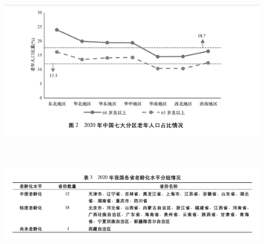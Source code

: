 \documentclass[presentation]{beamer}
\begin{document}
\begin{frame}[label={sec:org18d29be}]{​}
\begin{figure}[htbp]
\centering
\includegraphics[width=.99\textwidth]{./8.png}
\label{}
\end{figure}
\end{frame}
\begin{frame}[label={sec:orgc0e4e1e}]{​}
\begin{figure}[htbp]
\centering
\includegraphics[width=.99\textwidth]{./9.png}
\label{}
\end{figure}
\end{frame}
\end{document}
